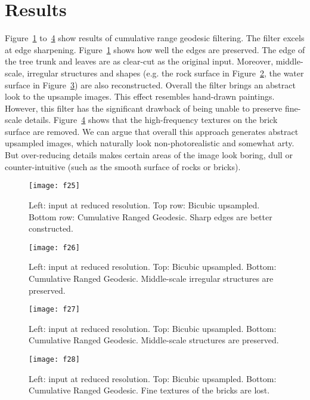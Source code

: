 \section{Results}\label{sec:FilterResult}


Figure~\ref{fig:geoTree} to~\ref{fig:geoSedona} show results of cumulative range geodesic filtering. The filter excels at edge sharpening. Figure~\ref{fig:geoTree} shows how well the edges are preserved. The edge of the tree trunk and leaves are as clear-cut as the original input. Moreover, middle-scale, irregular structures and shapes (e.g. the rock surface in Figure~\ref{fig:geoPicnic}, the water surface in Figure~\ref{fig:geoRoughWater}) are also reconstructed. Overall the filter brings an abstract look to the upsample images. This effect resembles hand-drawn paintings. However, this filter has the significant drawback of being unable to preserve fine-scale details. Figure~\ref{fig:geoSedona} shows that the high-frequency textures on the brick surface are removed. We can argue that overall this approach generates abstract upsampled images, which naturally look non-photorealistic and somewhat arty. But over-reducing details makes certain areas of the image look boring, dull or counter-intuitive (such as the smooth surface of rocks or bricks). 


\begin{figure}[htbp]\centering
\texttt{[image: f25]}
\caption{Left: input at reduced resolution. Top row: Bicubic upsampled. Bottom row: Cumulative Ranged Geodesic. Sharp edges are better constructed.}
\label{fig:geoTree}
\end{figure}

\begin{figure}[htbp]\centering
\texttt{[image: f26]}
\caption{Left: input at reduced resolution. Top: Bicubic upsampled. Bottom: Cumulative Ranged Geodesic. Middle-scale irregular structures are preserved.}
\label{fig:geoPicnic}
\end{figure}

\begin{figure}[htbp]\centering
\texttt{[image: f27]}
\caption{Left: input at reduced resolution. Top: Bicubic upsampled. Bottom: Cumulative Ranged Geodesic. Middle-scale structures are preserved.}
\label{fig:geoRoughWater}
\end{figure}

\begin{figure}[htbp]\centering
\texttt{[image: f28]}
\caption{Left: input at reduced resolution. Top: Bicubic upsampled. Bottom: Cumulative Ranged Geodesic. Fine textures of the bricks are lost.}
\label{fig:geoSedona}
\end{figure}


